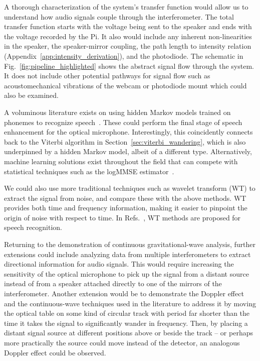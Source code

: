 \documentclass[paper-main.tex]{subfiles}
\begin{document}
A thorough characterization of the system's transfer function would allow us to understand how audio signals couple through the interferometer. 
The total transfer function starts with the voltage being sent to the speaker and ends with the voltage recorded by the Pi. It also would include any inherent non-linearities in the speaker, the speaker-mirror coupling, the path length to intensity relation (Appendix~\ref{app:intensity_derivation}), and the photodiode. The schematic in Fig.~\ref{fig:pipeline_highlighted} shows the abstract signal flow through the system.
It does not include other potential pathways for signal flow such as acoustomechanical vibrations of the webcam or photodiode mount which could also be examined.

A voluminous literature exists on using hidden Markov models trained on phonemes to recognize speech~\cite{HMM_english}. These could perform the final stage of speech enhancement for the optical microphone. Interestingly, this coincidently connects back to the Viterbi algorithm in Section~\ref{sec:viterbi_wandering}, which is also underpinned by a hidden Markov model, albeit of a different type. Alternatively, machine learning solutions exist throughout the field that can compete with statistical techniques such as the logMMSE estimator~\cite{SEGAN}.


We could also use more traditional techniques such as wavelet transform (WT) \citep{nason1995stationary} to extract the signal from noise, and compare these with the above methods. WT provides both time and frequency information, making it easier to pinpoint the origin of noise with respect to time. In Refs.~\cite{tufekci2000feature,agbinya1996discrete}, WT methods are proposed for speech recognition. 

Returning to the demonstration of continuous gravitational-wave analysis, further extensions could include analyzing data from multiple interferometers to extract directional information for audio signals. 
This would require increasing the sensitivity of the optical microphone to pick up the signal from a distant source instead of from a speaker attached directly to one of the mirrors of the interferometer.
Another extension would be to demonstrate the Doppler effect and the continuous-wave techniques used in the literature to address it by moving the optical table on some kind of circular track with period far shorter than the time it takes the signal to significantly wander in frequency. Then, by placing a distant signal source at different positions above or beside the track -- or perhaps more practically the source could move instead of the detector, an analogous Doppler effect could be observed.
\end{document}
